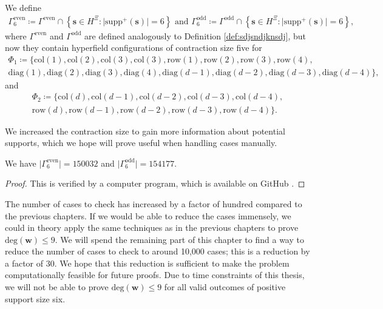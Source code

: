 \begin{definition}
    We define 
    \begin{gather*}
        \Gamma^{\mathrm{even}}_6 \coloneqq \Gamma^{\mathrm{even}} \cap \left\{ \mathbf{s} \in H^{\Xi} : \lvert \mathrm{supp}^+(\mathbf{s}) \rvert = 6 \right\}
        \text{ and }
        \Gamma^{\mathrm{odd}}_6 \coloneqq \Gamma^{\mathrm{odd}} \cap \left\{ \mathbf{s} \in H^{\Xi} : \lvert \mathrm{supp}^+(\mathbf{s}) \rvert = 6 \right\},
    \end{gather*}
    where \( \Gamma^{\mathrm{even}}  \) and \(  \Gamma^{\mathrm{odd}} \) are defined analogously to Definition \ref{def:sdjsndjknsdj}, but now they contain hyperfield configurations of contraction size five for 
    \begin{gather*}
        \Phi_1 \coloneqq \{ 
            \mathrm{col}(1), \mathrm{col}(2), \mathrm{col}(3), \mathrm{col}(3), \mathrm{row}(1), \mathrm{row}(2), \mathrm{row}(3),  \mathrm{row}(4),\\
             \mathrm{diag}(1), \mathrm{diag}(2), \mathrm{diag}(3), \mathrm{diag}(4), \mathrm{diag}(d-1), \mathrm{diag}(d-2), \mathrm{diag}(d-3), \mathrm{diag}(d-4) 
         \},
    \end{gather*}
    and 
    \begin{gather*}
        \Phi_2 \coloneqq \{ 
            \mathrm{col}(d), \mathrm{col}(d-1), \mathrm{col}(d-2), \mathrm{col}(d-3), \mathrm{col}(d-4), \\
            \mathrm{row}(d), \mathrm{row}(d-1), \mathrm{row}(d-2), \mathrm{row}(d-3), \mathrm{row}(d-4) 
         \}.
    \end{gather*}
\end{definition}


We increased the contraction size to gain more information about potential supports, which we hope will prove useful when handling cases manually.

\begin{proposition}
    We have \( \lvert \Gamma^{\mathrm{even}}_6 \rvert  = 150032\) and \( \lvert \Gamma^{\mathrm{odd}}_6 \rvert  = 154177\).
\end{proposition}

\begin{proof}
    This is verified by a computer program, which is available on GitHub \cite{ducrepo}. 
\end{proof}

The number of cases to check has increased by a factor of hundred compared to the previous chapters. If we would be able to reduce the cases immensely, we could in theory apply the same techniques as in the previous chapters to prove \( \mathrm{deg}(\mathbf w) \leq 9 \). We will spend the remaining part of this chapter to find a way to reduce the number of cases to check to around 10,000 cases; this is a reduction by a factor of 30. We hope that this reduction is sufficient to make the problem computationally feasible for future proofs. Due to time constraints of this thesis, we will not be able to prove \( \mathrm{deg}(\mathbf w) \leq 9 \) for all valid outcomes of positive support size six.

